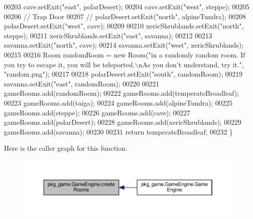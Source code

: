 \begin{DoxyCode}
00203         cave.setExit(\textcolor{stringliteral}{"east"}, polarDesert);
00204         cave.setExit(\textcolor{stringliteral}{"west"}, steppe);
00205 
00206         \textcolor{comment}{// Trap Door}
00207         \textcolor{comment}{// polarDesert.setExit("north", alpineTundra);}
00208         polarDesert.setExit(\textcolor{stringliteral}{"west"}, cave);
00209 
00210         xericShrublands.setExit(\textcolor{stringliteral}{"north"}, steppe);
00211         xericShrublands.setExit(\textcolor{stringliteral}{"east"}, savanna);
00212 
00213         savanna.setExit(\textcolor{stringliteral}{"north"}, cave);
00214         savanna.setExit(\textcolor{stringliteral}{"west"}, xericShrublands);
00215 
00216         Room randomRoom = \textcolor{keyword}{new} Room(\textcolor{stringliteral}{"in a randomly random room. If you try to escape it, you will be
       teleported.\(\backslash\)nAs you don't understand, try it."}, \textcolor{stringliteral}{"random.png"});
00217 
00218         polarDesert.setExit(\textcolor{stringliteral}{"south"}, randomRoom);
00219         savanna.setExit(\textcolor{stringliteral}{"east"}, randomRoom);
00220 
00221         gameRooms.add(randomRoom);
00222         gameRooms.add(temperateBroadleaf);
00223         gameRooms.add(taiga);
00224         gameRooms.add(alpineTundra);
00225         gameRooms.add(steppe);
00226         gameRooms.add(cave);
00227         gameRooms.add(polarDesert);
00228         gameRooms.add(xericShrublands);
00229         gameRooms.add(savanna);
00230 
00231         \textcolor{keywordflow}{return} temperateBroadleaf;
00232     \}
\end{DoxyCode}


Here is the caller graph for this function\-:\nopagebreak
\begin{figure}[H]
\begin{center}
\leavevmode
\includegraphics[width=350pt]{classpkg__game_1_1GameEngine_a986180eff9d235e3b619c7403accfc31_icgraph}
\end{center}
\end{figure}


